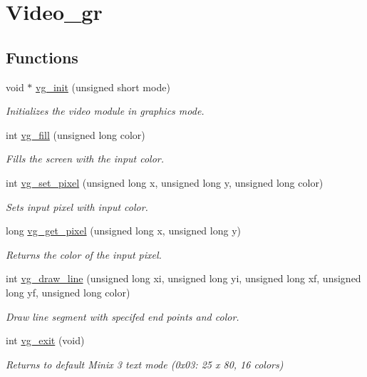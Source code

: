 \hypertarget{group___video__gr}{\section{Video\-\_\-gr}
\label{group___video__gr}
}
\subsection*{Functions}
\begin{DoxyCompactItemize}
\item 
void $\ast$ \hyperlink{group___video__gr_gacef21667c79365d57a084bed994c2189}{vg\-\_\-init} (unsigned short mode)
\begin{DoxyCompactList}\small\item\em Initializes the video module in graphics mode. \end{DoxyCompactList}\item 
int \hyperlink{group___video__gr_ga225408a4d744af43112aa410a92d303b}{vg\-\_\-fill} (unsigned long color)
\begin{DoxyCompactList}\small\item\em Fills the screen with the input color. \end{DoxyCompactList}\item 
int \hyperlink{group___video__gr_ga8399aae2d2f8a89099f6724e54b5cc42}{vg\-\_\-set\-\_\-pixel} (unsigned long x, unsigned long y, unsigned long color)
\begin{DoxyCompactList}\small\item\em Sets input pixel with input color. \end{DoxyCompactList}\item 
long \hyperlink{group___video__gr_ga7b7c675724dbf5111fed98e705f8c639}{vg\-\_\-get\-\_\-pixel} (unsigned long x, unsigned long y)
\begin{DoxyCompactList}\small\item\em Returns the color of the input pixel. \end{DoxyCompactList}\item 
int \hyperlink{group___video__gr_gad0f2eebeb8a3dc1e68ed66d52c1e183f}{vg\-\_\-draw\-\_\-line} (unsigned long xi, unsigned long yi, unsigned long xf, unsigned long yf, unsigned long color)
\begin{DoxyCompactList}\small\item\em Draw line segment with specifed end points and color. \end{DoxyCompactList}\item 
int \hyperlink{group___video__gr_ga42f593e6656f1a978315aff02b1bcebf}{vg\-\_\-exit} (void)
\begin{DoxyCompactList}\small\item\em Returns to default Minix 3 text mode (0x03\-: 25 x 80, 16 colors) \end{DoxyCompactList}\end{DoxyCompactItemize}


